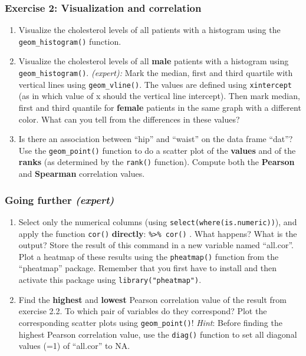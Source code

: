 \documentclass[
]{book}
\begin{document}
\hypertarget{exercise-2-visualization-and-correlation}{%
\subsubsection{Exercise 2: Visualization and correlation}\label{exercise-2-visualization-and-correlation}}

\begin{enumerate}
\def\labelenumi{\arabic{enumi}.}
\item
  Visualize the cholesterol levels of all patients with a histogram using the \texttt{geom\_histogram()} function.
\item
  Visualize the cholesterol levels of all \textbf{male} patients with a histogram using \texttt{geom\_histogram()}.
  \emph{(expert):} Mark the median, first and third quartile with vertical lines using \texttt{geom\_vline()}. The values are defined using \texttt{xintercept} (as in which value of x should the vertical line intercept).
  Then mark median, first and third quantile for \textbf{female} patients in the same graph with a different color.
  What can you tell from the differences in these values?
\item
  Is there an association between ``hip'' and ``waist'' on the data frame ``dat''? Use the \texttt{geom\_point()} function to do a scatter plot of the \textbf{values} and of the \textbf{ranks} (as determined by the \texttt{rank()} function). Compute both the \textbf{Pearson} and \textbf{Spearman} correlation values.
\end{enumerate}

\hypertarget{going-further-expert}{%
\subsubsection{\texorpdfstring{Going further \emph{(expert)}}{Going further (expert)}}\label{going-further-expert}}

\begin{enumerate}
\def\labelenumi{\arabic{enumi}.}
\item
  Select only the numerical columns (using \texttt{select(where(is.numeric))}), and apply the function \texttt{cor()} \textbf{directly}: \texttt{\%\textgreater{}\%\ cor()} . What happens? What is the output? Store the result of this command in a new variable named ``all.cor''. Plot a heatmap of these results using the \texttt{pheatmap()} function from the ``pheatmap'' package. Remember that you first have to install and then activate this package using \texttt{library("pheatmap")}.
\item
  Find the \textbf{highest} and \textbf{lowest} Pearson correlation value of the result from exercise 2.2. To which pair of variables do they correspond? Plot the corresponding scatter plots using \texttt{geom\_point()}! \emph{Hint}: Before finding the highest Pearson correlation value, use the \texttt{diag()} function to set all diagonal values (=1) of ``all.cor'' to NA.
\end{enumerate}
\end{document}
